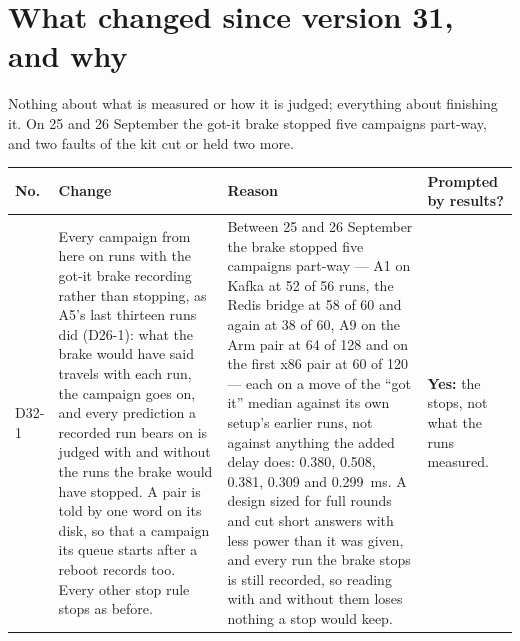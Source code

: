 \documentclass[11pt]{article}
\begin{document}
\section*{What changed since version 31, and why}
Nothing about what is measured or how it is judged; everything about finishing it. On 25 and
26 September the got-it brake stopped five campaigns part-way, and two faults of the kit cut
or held two more.

{\small
\begin{longtable}{@{}p{1.1cm} >{\raggedright\arraybackslash}p{6.1cm} >{\raggedright\arraybackslash}p{6.0cm} >{\raggedright\arraybackslash}p{2.2cm}@{}}
\toprule
\textbf{No.} & \textbf{Change} & \textbf{Reason} & \textbf{Prompted by results?} \\
\midrule
\endhead
D32-1 & Every campaign from here on runs with the got-it brake recording rather than stopping, as A5's last thirteen runs did (D26-1): what the brake would have said travels with each run, the campaign goes on, and every prediction a recorded run bears on is judged with and without the runs the brake would have stopped. A pair is told by one word on its disk, so that a campaign its queue starts after a reboot records too. Every other stop rule stops as before. & Between 25 and 26 September the brake stopped five campaigns part-way --- A1 on Kafka at 52 of 56 runs, the Redis bridge at 58 of 60 and again at 38 of 60, A9 on the Arm pair at 64 of 128 and on the first x86 pair at 60 of 120 --- each on a move of the ``got it'' median against its own setup's earlier runs, not against anything the added delay does: 0.380, 0.508, 0.381, 0.309 and 0.299~ms. A design sized for full rounds and cut short answers with less power than it was given, and every run the brake stops is still recorded, so reading with and without them loses nothing a stop would keep. & \textbf{Yes:} the stops, not what the runs measured. \\

\end{longtable}}
\end{document}
